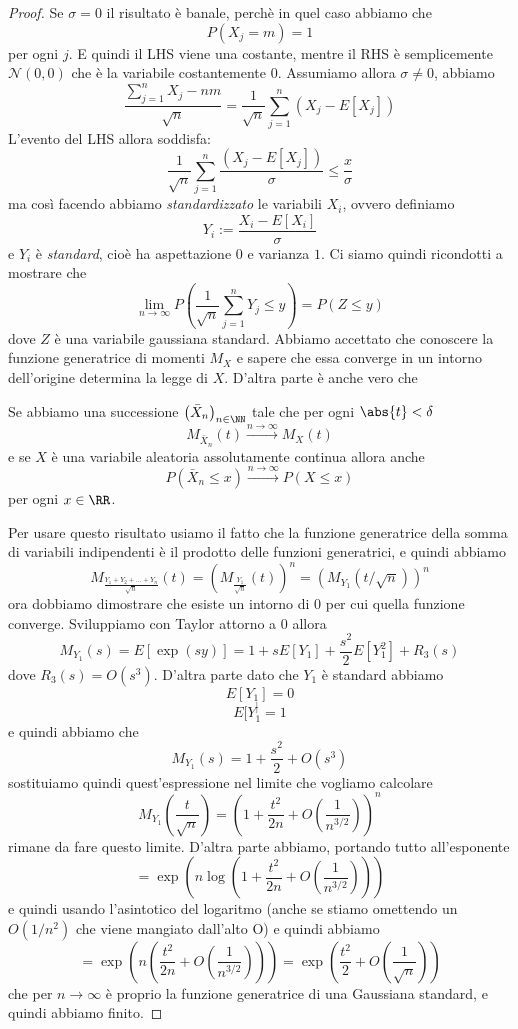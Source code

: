 \documentclass[11pt]{scrartcl}
\begin{document}
	\begin{proof}
		Se $\sigma=0$ il risultato è banale, perchè in quel caso abbiamo che 
		$$P(X_j=m)=1$$
		per ogni $j$. E quindi il LHS viene una costante, mentre il RHS è semplicemente $\mathcal{N}(0,0)$ che è la variabile costantemente $0$. Assumiamo allora $\sigma\ne 0$, abbiamo
		$$\frac{\sum_{j=1}^{n}X_j-nm}{\sqrt{n}}=\frac{1}{\sqrt{n}}\sum_{j=1}^{n}\left(X_j-E[X_j]\right)$$
		L'evento del LHS allora soddisfa:
		$$\frac{1}{\sqrt{n}}\sum_{j=1}^{n}\frac{\left(X_j-E[X_j]\right)}{\sigma}\le \frac{x}{\sigma}$$
		ma così facendo abbiamo \textit{standardizzato} le variabili $X_i$, ovvero definiamo
		$$Y_i:=\frac{X_i-E[X_i]}{\sigma}$$
		e $Y_i$ è \textit{standard}, cioè ha aspettazione $0$ e varianza $1$. Ci siamo quindi ricondotti a mostrare che 
		$$\lim_{n\to\infty}P\left(\frac{1}{\sqrt{n}}\sum_{j=1}^{n}Y_j\le y\right)=P\left(Z\le y\right)$$
		dove $Z$ è una variabile gaussiana standard. Abbiamo accettato che conoscere la funzione generatrice di momenti $M_X$ e sapere che essa converge in un intorno dell'origine determina la legge di $X$. D'altra parte è anche vero che 
		\begin{lemma}
			Se abbiamo una successione $\left(\bar{X}_n\right)_{n\in\NN}$ tale che per ogni $\abs{t}<\delta$ 
			$$M_{\bar{X}_n}(t)\overset{n\to\infty}{\longrightarrow} M_X(t)$$
			e se $X$ è una variabile aleatoria assolutamente continua allora anche 
			$$P\left(\bar{X}_n\le x\right)\overset{n\to\infty}{\longrightarrow}P(X\le x)$$
			per ogni $x\in \RR$.
		\end{lemma} 
		Per usare questo risultato usiamo il fatto che la funzione generatrice della somma di variabili indipendenti è il prodotto delle funzioni generatrici, e quindi abbiamo
		$$M_{\frac{Y_1+Y_2+\dots+Y_n}{\sqrt{n}}}(t)=\left(M_\frac{Y_1}{\sqrt{n}}(t)\right)^n=\left(M_{Y_1}(t/\sqrt{n})\right)^n$$
		ora dobbiamo dimostrare che esiste un intorno di $0$ per cui quella funzione converge. Sviluppiamo con Taylor attorno a $0$ allora
		$$M_{Y_1}(s)=E\left[\exp(sy)\right]=1+sE[Y_1]+\frac{s^2}{2}E[Y_1^2]+R_3(s)$$
		dove $R_3(s)=O(s^3)$. D'altra parte dato che $Y_1$ è standard abbiamo
		$$E[Y_1]=0$$
		$$E[Y_1^]=1$$
		e quindi abbiamo che
		$$M_{Y_1}(s)=1+\frac{s^2}{2}+O(s^3)$$
		sostituiamo quindi quest'espressione nel limite che vogliamo calcolare
		$$M_{Y_1}\left(\frac{t}{\sqrt{n}}\right)=\left(1+\frac{t^2}{2n}+O\left(\frac{1}{n^{3/2}}\right)\right)^n$$
		rimane da fare questo limite. D'altra parte abbiamo, portando tutto all'esponente
		$$=\exp\left(n\log\left(1+\frac{t^2}{2n}+O\left(\frac{1}{n^{3/2}}\right)\right)\right)$$
		e quindi usando l'asintotico del logaritmo (anche se stiamo omettendo un $O\left(1/n^2\right)$ che viene mangiato dall'alto O) e quindi abbiamo 
		$$=\exp\left(n\left(\frac{t^2}{2n}+O\left(\frac{1}{n^{3/2}}\right)\right)\right)=\exp\left(\frac{t^2}{2}+O\left(\frac{1}{\sqrt{n}}\right)\right)$$
		che per $n\to\infty$ è proprio la funzione generatrice di una Gaussiana standard, e quindi abbiamo finito.
	\end{proof}
\end{document}
